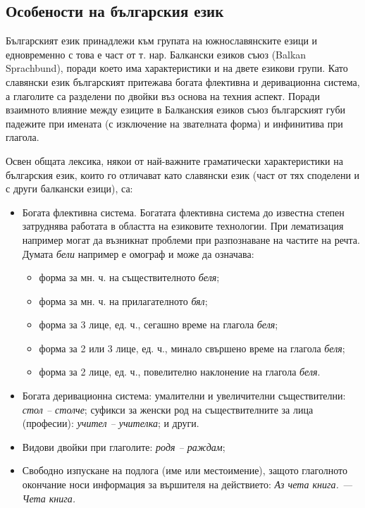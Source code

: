 \documentclass[]{../../metanetpaper}
\begin{document}
\begin{multicols}{2}
\subsection{Особености на българския език}

Българският език принадлежи към групата на южнославянските езици и едновременно с това е част от
 т. нар. Балкански езиков съюз (Balkan Sprachbund), поради което има характеристики и на двете езикови групи. Като славянски език българският притежава богата флективна и деривационна система, а глаголите са
 разделени по двойки въз основа на техния аспект. Поради взаимното влияние между езиците в Балканския езиков съюз българският губи падежите при
 имената (с изключение на звателната форма) и
 инфинитива при глагола.

Освен общата лексика, някои от най-важните граматически характеристики на българския език, които го отличават като славянски език (част от тях споделени и с други балкански езици), са:

\begin{itemize}
\item Богата флективна система. Богатата флективна
система до известна степен затруднява работата в областта на
 езиковите технологии.
 При лематизация например могат да възникнат
 проблеми при разпознаване
 на
 частите на речта. Думата \textit{бели} например е омограф и
 може да означава: 

\begin{itemize}
\item форма за мн. ч. на съществителното \textit{беля};
\item форма за мн. ч. на прилагателното \textit{бял};
\item форма за 3 лице, ед. ч., сегашно време на глагола
 \textit{беля};
\item форма за 2 или 3 лице, ед. ч., минало свършено време
 на глагола \textit{беля};
\item форма за 2 лице, ед. ч., повелително наклонение на
 глагола \textit{беля}.
\end{itemize}

\item Богата деривационна система: умалителни и увеличителни съществителни: {\it стол – столче}; суфикси
 за женски род на съществителните за лица (професии): {\it учител – учителка}; и други.
\item Видови двойки при глаголите: {\it родя – раждам};
\item Свободно изпускане на подлога (име или местоимение), защото глаголното окончание носи информация за вършителя на действието: \textit{Аз чета книга. — Чета книга.}
\end{itemize}


\end{multicols}
\end{document}
